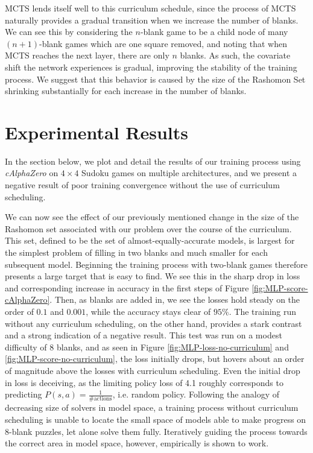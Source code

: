 \documentclass[10pt, reqno, letterpaper, twoside]{amsart}
\begin{document}
MCTS lends itself well to this curriculum schedule, since the process of MCTS naturally provides a gradual transition when we increase the number of blanks. We can see this by considering the $n$-blank game to be a child node of many $(n+1)$-blank games which are one square removed, and noting that when MCTS reaches the next layer, there are only $n$ blanks. As such, the covariate shift the network experiences is gradual, improving the stability of the training process.  We suggest that this behavior is caused by the size of the Rashomon Set\cite{Semenova_2022} shrinking substantially for each increase in the number of blanks. 

\section{Experimental Results}

In the section below, we plot and detail the results of our training process using \textit{cAlphaZero} on $4 \times 4$ Sudoku games on multiple architectures, and we present a negative result of poor training convergence without the use of curriculum scheduling. 

We can now see the effect of our previously mentioned change in the size of the Rashomon set associated with our problem over the course of the curriculum. This set, defined to be the set of almost-equally-accurate models, is largest for the simplest problem of filling in two blanks and much smaller for each subsequent model. Beginning the training process with two-blank games therefore presents a large target that is easy to find. We see this in the sharp drop in loss and corresponding increase in accuracy in the first steps of Figure \ref{fig:MLP-score-cAlphaZero}. Then, as blanks are added in, we see the losses hold steady on the order of $0.1$ and $0.001$, while the accuracy stays clear of $95\%$. The training run without any curriculum scheduling, on the other hand, provides a stark contrast and a strong indication of a negative result. This test was run on a modest difficulty of $8$ blanks, and as seen in Figure \ref{fig:MLP-loss-no-curriculum} and \ref{fig:MLP-score-no-curriculum}, the loss initially drops, but hovers about an order of magnitude above the losses with curriculum scheduling. Even the initial drop in loss is deceiving, as the limiting policy loss of 4.1 roughly corresponds to predicting $P(s,a)=\frac{1}{\text{\# actions}}$, i.e. random policy. Following the analogy of decreasing size of solvers in model space, a training process without curriculum scheduling is unable to locate the small space of models able to make progress on $8$-blank puzzles, let alone solve them fully. Iteratively guiding the process towards the correct area in model space, however, empirically is shown to work. 
\end{document}

